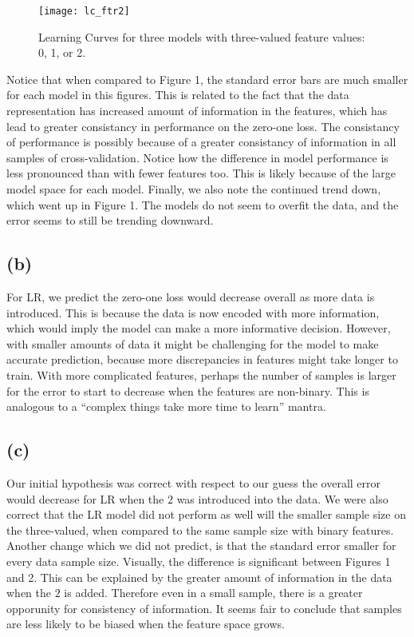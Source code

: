 \documentclass[11pt]{article}
\begin{document}
\begin{minipage}{0.5\textwidth}
  \begin{figure}[H]
    \centering
    \texttt{[image: lc\_ftr2]}
    \caption{Learning Curves for three models with three-valued feature values: 0, 1, or 2.}
  \end{figure}
\end{minipage}%
\hspace{5mm}
\begin{minipage}{0.5\textwidth}
  Notice that when compared to Figure 1, the standard error bars are much smaller for each model in this figures. This is related to the fact that the data representation has increased amount of information in the features, which has lead to greater consistancy in performance on the zero-one loss. The consistancy of performance is possibly because of a greater consistancy of information in all samples of cross-validation. Notice how the difference in model performance is less pronounced than with fewer features too. This is likely because of the large model space for each model. Finally, we also note the continued trend down, which went up in Figure 1. The models do not seem to overfit the data, and the error seems to still be trending downward.
\end{minipage}


\subsection*{(b)}

For LR, we predict the zero-one loss would decrease overall as more data is introduced. This is because the data is now encoded with more information, which would imply the model can make a more informative decision. However, with smaller amounts of data it might be challenging for the model to make accurate prediction, because more discrepancies in features might take longer to train. With more complicated features, perhaps the number of samples is larger for the error to start to decrease when the features are non-binary. This is analogous to a ``complex things take more time to learn'' mantra.

\subsection*{(c)}

Our initial hypothesis was correct with respect to our guess the overall error would decrease for LR when the $2$ was introduced into the data. We were also correct that the LR model did not perform as well will the smaller sample size on the three-valued, when compared to the same sample size with binary features.
Another change which we did not predict, is that the standard error smaller for every data sample size. Visually, the difference is significant between Figures 1 and 2. This can be explained by the greater amount of information in the data when the $2$ is added. Therefore even in a small sample, there is a greater opporunity for consistency of information. It seems fair to conclude that samples are less likely to be biased when the feature space grows.
\end{document}
